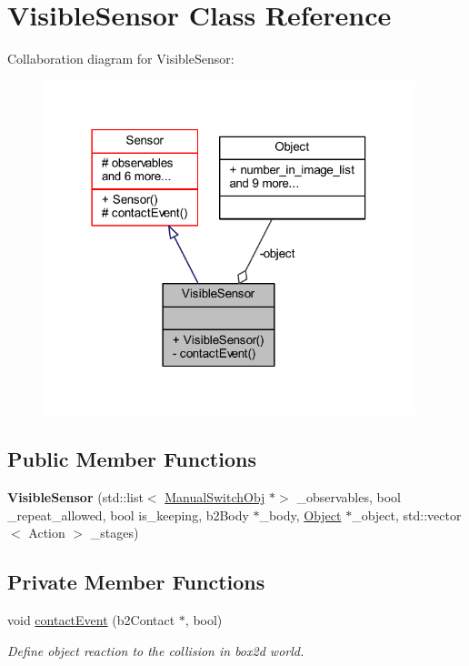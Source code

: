 \hypertarget{class_visible_sensor}{}\section{Visible\+Sensor Class Reference}
\label{class_visible_sensor}


Collaboration diagram for Visible\+Sensor\+:\nopagebreak
\begin{figure}[H]
\begin{center}
\leavevmode
\includegraphics[width=306pt]{class_visible_sensor__coll__graph}
\end{center}
\end{figure}
\subsection*{Public Member Functions}
\begin{DoxyCompactItemize}
\item 
\mbox{\label{class_visible_sensor_a45c102db9ef942dcb5bfc5dba9030add}} 
{\bfseries Visible\+Sensor} (std\+::list$<$ \hyperlink{class_manual_switch_obj}{Manual\+Switch\+Obj} $\ast$$>$ \+\_\+observables, bool \+\_\+repeat\+\_\+allowed, bool is\+\_\+keeping, b2\+Body $\ast$\+\_\+body, \hyperlink{class_object}{Object} $\ast$\+\_\+object, std\+::vector$<$ Action $>$ \+\_\+stages)
\end{DoxyCompactItemize}
\subsection*{Private Member Functions}
\begin{DoxyCompactItemize}
\item 
void \hyperlink{class_visible_sensor_a63bcb9da7556a6356cca3b08f7808bd8}{contact\+Event} (b2\+Contact $\ast$, bool)
\begin{DoxyCompactList}\small\item\em Define object reaction to the collision in box2d world. \end{DoxyCompactList}\end{DoxyCompactItemize}

